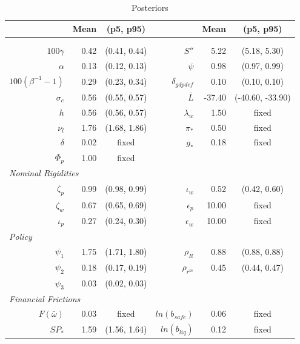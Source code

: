 \documentclass[12pt]{article}
\begin{document}
\pagestyle{empty}
\renewcommand*\footnoterule{}\vspace*{.5cm}
{\small
\begin{longtable}{rrc@{\hspace{1in}}rrc}
\caption{Posteriors}
\label{tab:param-posteriors}
\\ \hline
& Mean & (p5, p95) & & Mean & (p5, p95) \\ \hline
\endhead
\hline \\
\endfoot
\multicolumn{6}{l}{\textit{Steady State}} \\[3pt]
$100\gamma$ & 0.42 & (0.41, 0.44) & $S''$ & 5.22 & (5.18, 5.30) \\
$\alpha$ & 0.13 & (0.12, 0.13) & $\psi$ & 0.98 & (0.97, 0.99) \\
$100(\beta^{-1} - 1)$ & 0.29 & (0.23, 0.34) & $\delta_{gdpdef}$ & 0.10 & (0.10, 0.10) \\
$\sigma_{c}$ & 0.56 & (0.55, 0.57) & $\bar{L}$ & -37.40 & (-40.60, -33.90) \\
$h$ & 0.56 & (0.56, 0.57) & $\lambda_w$ & 1.50 & \scriptsize{fixed} \\
$\nu_l$ & 1.76 & (1.68, 1.86) & $\pi_*$ & 0.50 & \scriptsize{fixed} \\
$\delta$ & 0.02 & \scriptsize{fixed} & $g_*$ & 0.18 & \scriptsize{fixed} \\
$\Phi_p$ & 1.00 & \scriptsize{fixed} & & & \\[3pt]
\multicolumn{6}{l}{\textit{Nominal Rigidities}} \\[3pt]
$\zeta_p$ & 0.99 & (0.98, 0.99) & $\iota_w$ & 0.52 & (0.42, 0.60) \\
$\zeta_w$ & 0.67 & (0.65, 0.69) & $\epsilon_{p}$ & 10.00 & \scriptsize{fixed} \\
$\iota_p$ & 0.27 & (0.24, 0.30) & $\epsilon_{w}$ & 10.00 & \scriptsize{fixed} \\[3pt]
\multicolumn{6}{l}{\textit{Policy}} \\[3pt]
$\psi_1$ & 1.75 & (1.71, 1.80) & $\rho_R$ & 0.88 & (0.88, 0.88) \\
$\psi_2$ & 0.18 & (0.17, 0.19) & $\rho_{r^m}$ & 0.45 & (0.44, 0.47) \\
$\psi_3$ & 0.03 & (0.02, 0.03) & & & \\[3pt]
\multicolumn{6}{l}{\textit{Financial Frictions}} \\[3pt]
$F(\bar{\omega})$ & 0.03 & \scriptsize{fixed} & $ln(b_{safe})$ & 0.06 & \scriptsize{fixed} \\
$SP_*$ & 1.59 & (1.56, 1.64) & $ln(b_{liq})$ & 0.12 & \scriptsize{fixed} \\

\end{longtable}}
\end{document}
